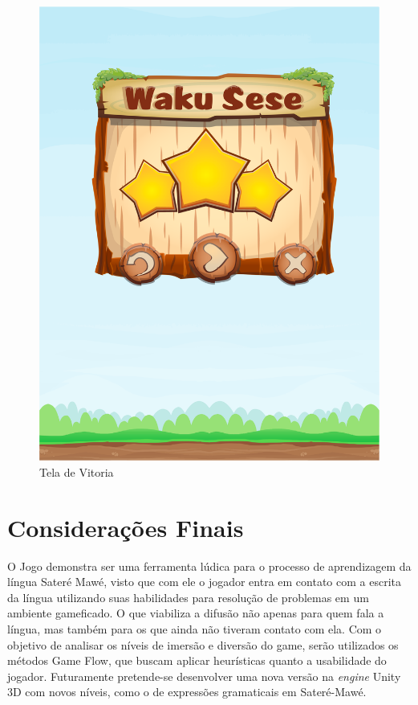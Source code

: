 \documentclass[12pt]{article}
\begin{document}
\begin{figure}[!htb]
			\includegraphics[width=\linewidth]{img/vitoria.png}
			\caption{Tela de Vitoria}\label{fig:feed}
			\endminipage
		\end{figure}
		
		
		\section{Considerações Finais}
			O Jogo demonstra ser uma ferramenta lúdica para o processo de aprendizagem da língua Sateré Mawé, visto que com ele o jogador entra em contato com a escrita da língua utilizando suas habilidades para resolução de problemas em um ambiente gameficado. O que viabiliza a difusão não apenas para quem fala a língua, mas também para os que ainda não tiveram contato com ela. Com o objetivo de analisar os níveis de imersão e diversão do game, serão utilizados os métodos Game Flow, que buscam aplicar heurísticas quanto a usabilidade do jogador. Futuramente pretende-se desenvolver uma nova versão na \textit{engine} Unity 3D com novos níveis, como o de expressões gramaticais em Sateré-Mawé.

	
	
\end{document}
